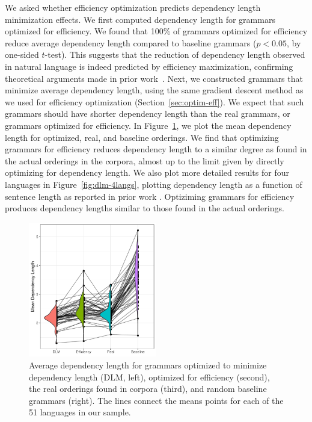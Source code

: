 \documentclass[10pt,twoside,lineno]{article}
\begin{document}
We asked whether efficiency optimization predicts dependency length minimization effects.
We first computed dependency length for grammars optimized for efficiency.
We found that 100\% of grammars optimized for efficiency reduce average dependency length compared to baseline grammars ($p < 0.05$, by one-sided $t$-test). 
This suggests that the reduction of dependency length observed in natural language is indeed predicted by efficiency maximization, confirming theoretical arguments made in prior work~\cite{hawkins1994performance,hawkins2004efficiency,futrell2017memory, futrell2017generalizing}.
Next, we constructed grammars that minimize average dependency length, using the same gradient descent method as we used for efficiency optimization (Section~\ref{sec:optim-eff}).
We expect that such grammars should have shorter dependency length than the real grammars, or grammars optimized for efficiency.
In Figure~\ref{fig:dlm-avg}, we plot the mean dependency length for optimized, real, and baseline orderings.
We find that optimizing grammars for efficiency reduces dependency length to a similar degree as found in the actual orderings in the corpora, almost up to the limit given by directly optimizing for dependency length.
We also plot more detailed results for four languages in Figure~\ref{fig:dlm-4langs}, plotting dependency length as a function of sentence length as reported in prior work \cite{futrell2015largescale}.
Optiziming grammars for efficiency produces dependency lengths similar to those found in the actual orderings.

\begin{figure}[ht]
    \centering
     \includegraphics[width=0.5\textwidth]{depl-violin-all-1.png} %
        \caption{Average dependency length for grammars optimized to minimize dependency length (DLM, left), optimized for efficiency (second), the real orderings found in corpora (third), and random baseline grammars (right). The lines connect the means points for each of the 51 languages in our sample.}
    \label{fig:dlm-avg}
\end{figure}
\end{document}
